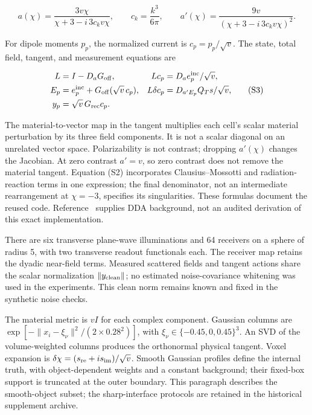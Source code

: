 \[
a(\chi)=\frac{3v\chi}{\chi+3-i\,3c_kv\chi},\qquad
c_k=\frac{k^3}{6\pi},\qquad
a'(\chi)=\frac{9v}{(\chi+3-i\,3c_kv\chi)^2}. \tag{S2}
\]

For dipole moments \(p_p\), the normalized current is \(c_p=p_p/\sqrt v\). The state, total field, tangent, and measurement equations are

\[
\begin{aligned}
L&=I-D_aG_{\rm off},&
Lc_p&=D_ae_p^{\rm inc}/\sqrt v,\\
E_p&=e_p^{\rm inc}+G_{\rm off}(\sqrt v\,c_p),&
L\delta c_p&=D_{a'E_p}Q_Ts/\sqrt v,\\
y_p&=\sqrt v\,G_{\rm rec}c_p.
\end{aligned} \tag{S3}
\]

The material-to-vector map in the tangent multiplies each cell's scalar material perturbation by its three field components. It is not a scalar diagonal on an unrelated vector space. Polarizability is not contrast; dropping \(a'(\chi)\) changes the Jacobian. At zero contrast \(a'=v\), so zero contrast does not remove the material tangent. Equation (S2) incorporates Clausius--Mossotti and radiation-reaction terms in one expression; the final denominator, not an intermediate rearrangement at \(\chi=-3\), specifies its singularities. These formulas document the reused code. Reference~\cite{r11} supplies DDA background, not an audited derivation of this exact implementation.

There are six transverse plane-wave illuminations and 64 receivers on a sphere of radius 5, with two transverse readout functionals each. The receiver map retains the dyadic near-field terms. Measured scattered fields and tangent actions share the scalar normalization \(\|y_{\rm clean}\|\); no estimated noise-covariance whitening was used in the experiments. This clean norm remains known and fixed in the synthetic noise checks.

The material metric is \(vI\) for each complex component. Gaussian columns are \(\exp[-\|x_i-\xi_\nu\|^2/(2\times0.28^2)]\), with \(\xi_\nu\in\{-0.45,0,0.45\}^3\). An SVD of the volume-weighted columns produces the orthonormal physical tangent. Voxel expansion is \(\delta\chi=(s_{\rm re}+is_{\rm im})/\sqrt v\). Smooth Gaussian profiles define the internal truth, with object-dependent weights and a constant background; their fixed-box support is truncated at the outer boundary. This paragraph describes the smooth-object subset; the sharp-interface protocols are retained in the historical supplement archive.

